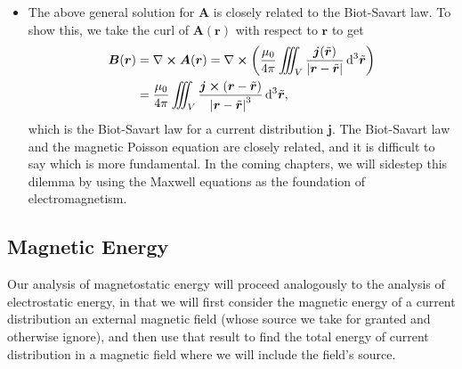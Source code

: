 \documentclass[11pt, a4paper]{article}
\newcommand{\diff}{\mathop{}\!\mathrm{d}} %
\newcommand{\dtr}{\diff^{3} \tilde{\r}}  %
\renewcommand{\vec}[1]{\bm{#1}} %
\renewcommand{\t}[1]{\tilde{#1}} %
\renewcommand{\r}{\vec{r}}
\newcommand{\B}{\vec{B}} %
\newcommand{\A}{\vec{A}} %
\newcommand{\mm}{\mu_{0}}  %
\renewcommand{\j}{\vec{j}}  %
\renewcommand{\curl}{\nabla \cross}
\begin{document}
\begin{itemize}
	\item The above general solution for $ \A $ is closely related to the Biot-Savart law. To show this, we take the curl of $ \A(\r) $ with respect to $ \r $ to get
	\begin{align*}
		\B(\r) &= \curl \A(\r) = \curl \left(\frac{\mm}{4\pi} \iiint_{V} \frac{\j(\t{\r})}{\abs{\r - \t{\r}}} \dtr\right)\\
		& = \frac{\mm}{4\pi} \iiint_{V} \frac{\j \cross (\r - \t{\r})}{\abs{\r - \t{\r}}^{3}} \dtr,
	\end{align*}
    which is the Biot-Savart law for a current distribution $ \j $. The Biot-Savart law and the magnetic Poisson equation are closely related, and it is difficult to say which is more fundamental. In the coming chapters, we will sidestep this dilemma by using the Maxwell equations as the foundation of electromagnetism.

\end{itemize}

\subsection{Magnetic Energy}
 Our analysis of magnetostatic energy will proceed analogously to the analysis of electrostatic energy, in that we will first consider the magnetic energy of a current distribution an external magnetic field (whose source we take for granted and otherwise ignore), and then use that result to find the total energy of current distribution in a magnetic field where we will include the field's source.
\end{document}
